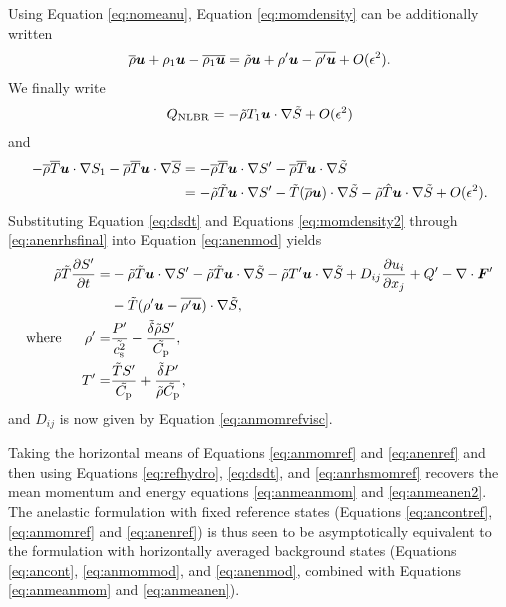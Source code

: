 \documentclass[12pt]{article}
\newcommand{\vecf}{\bm{F}}
\begin{document}
Using Equation \eqref{eq:nomeanu}, Equation \eqref{eq:momdensity} can be additionally written
  \begin{align}\label{eq:momdensity2}
\overline{\rho}\bm{u} + \rho_1\bm{u} - \overline{\rho_1\bm{u}} = \tilde{\rho}\bm{u} + \rho^\prime\bm{u} - \overline{\rho^\prime\bm{u}} + O(\epsilon^2).
\end{align}
We finally write 
\begin{align}
	Q_{\rm NLBR} = -\tilde{\rho} T_1\bm{u}\cdot\nabla\tilde{S} + O(\epsilon^2)
\end{align}
and 
\begin{align}\label{eq:anenrhsfinal}
	-\overline{\rho}\overline{T} \bm{u}\cdot\nabla S_1 - \overline{\rho}\overline{T} \bm{u}\cdot\nabla\overline{S} &= - \overline{\rho}\overline{T}\bm{u}\cdot\nabla S^\prime -\overline{\rho}\overline{T}\bm{u}\cdot\nabla\tilde{S} \nonumber\\
	&=-\tilde{\rho}\tilde{T}\bm{u}\cdot\nabla S^\prime - \tilde{T}(\overline{\rho} \bm{u})\cdot\nabla\tilde{S} - \tilde{\rho}\hat{T}\bm{u}\cdot\nabla\tilde{S} + O(\epsilon^2).
\end{align}
Substituting Equation \eqref{eq:dsdt} and Equations \eqref{eq:momdensity2} through \eqref{eq:anenrhsfinal} into Equation \eqref{eq:anenmod} yields
\begin{subequations}\label{eq:anenref}
	\begin{align}
		\rhotilde\tilde{T}\pderiv{\entrprime}{t}= &-\rhotilde\tilde{T}\ugrad \entrprime - \rhotilde\tilde{T} \ugrad \tilde{S} - \rhotilde \tmpprime\ugrad\tilde{S}+D_{ij}\pderiv{u_i}{x_j} + Q^\prime- \Div\vecf^\prime  \nonumber\\
		& - \tilde{T}(\rhoprime \vecu-\overline{\rhoprime\vecu})\cdot\nabla\tilde{S},\label{eq:anenrefmain}\\
		\where \rhoprime =& \frac{\prsprime}{\tilde{\cs^2}}-\frac{\tilde{\delta}\rhotilde S ^\prime}{\tilde{\cpcap}},\\
		 \tmpprime = & \frac{\tilde{T} \entrprime}{\tilde{\cpcap}} + \frac{\tilde{\delta} \prsprime}{\rhotilde\tilde{\cpcap}},
	\end{align}
\end{subequations}
and $D_{ij}$ is now given by Equation \eqref{eq:anmomrefvisc}. 

Taking the horizontal means of Equations \eqref{eq:anmomref} and \eqref{eq:anenref} and then using Equations \eqref{eq:refhydro}, \eqref{eq:dsdt}, and \eqref{eq:anrhsmomref} recovers the mean momentum and energy equations \eqref{eq:anmeanmom} and \eqref{eq:anmeanen2}. The anelastic formulation with fixed reference states (Equations \eqref{eq:ancontref}, \eqref{eq:anmomref} and \eqref{eq:anenref}) is thus seen to be asymptotically equivalent to the formulation with horizontally averaged background states (Equations \eqref{eq:ancont}, \eqref{eq:anmommod}, and \eqref{eq:anenmod}, combined with Equations \eqref{eq:anmeanmom} and \eqref{eq:anmeanen}). 
\end{document}
